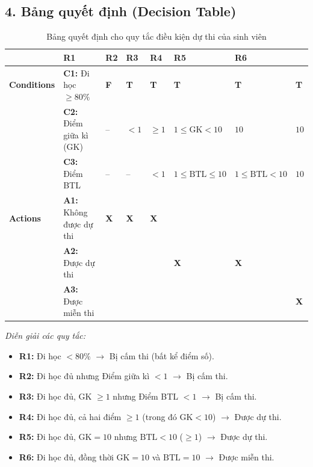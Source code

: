 \documentclass[11pt,a4paper]{article}
\begin{document}
\subsection*{4. Bảng quyết định (Decision Table)}

\begin{table}[H]
\centering
\renewcommand{\arraystretch}{1.25}
\begin{tabularx}{\textwidth}{|l|l|Y|Y|Y|Y|Y|Y|}
\hline
{}
 & \textbf{R1} & \textbf{R2} & \textbf{R3} & \textbf{R4} & \textbf{R5} & \textbf{R6} \\ \hline
\textbf{Conditions} & \textbf{C1:} Đi học $\ge 80\%$ & \textbf{F} & \textbf{T} & \textbf{T} & \textbf{T} & \textbf{T} & \textbf{T} \\ 
 & \textbf{C2:} Điểm giữa kì (GK) & -- & $< 1$ & $\ge 1$ & $1 \le \text{GK} < 10$ & $10$ & $10$ \\ 
 & \textbf{C3:} Điểm BTL & -- & -- & $< 1$ & $1 \le \text{BTL} \le 10$ & $1 \le \text{BTL} < 10$ & $10$ \\ \hline
\textbf{Actions} & \textbf{A1:} Không được dự thi & \textbf{X} & \textbf{X} & \textbf{X} & & & \\ 
 & \textbf{A2:} Được dự thi & & & & \textbf{X} & \textbf{X} & \\ 
 & \textbf{A3:} Được miễn thi & & & & & & \textbf{X} \\ \hline
\end{tabularx}
\caption*{Bảng quyết định cho quy tắc điều kiện dự thi của sinh viên}
\end{table}

\noindent\textit{Diễn giải các quy tắc:}
\begin{itemize}[noitemsep]
    \item \textbf{R1:} Đi học $< 80\%$ $\rightarrow$ Bị cấm thi (bất kể điểm số).
    \item \textbf{R2:} Đi học đủ nhưng Điểm giữa kì $< 1$ $\rightarrow$ Bị cấm thi.
    \item \textbf{R3:} Đi học đủ, GK $\ge 1$ nhưng Điểm BTL $< 1$ $\rightarrow$ Bị cấm thi.
    \item \textbf{R4:} Đi học đủ, cả hai điểm $\ge 1$ (trong đó $\text{GK} < 10$) $\rightarrow$ Được dự thi.
    \item \textbf{R5:} Đi học đủ, $\text{GK} = 10$ nhưng $\text{BTL} < 10$ ($\ge 1$) $\rightarrow$ Được dự thi.
    \item \textbf{R6:} Đi học đủ, đồng thời $\text{GK} = 10$ và $\text{BTL} = 10$ $\rightarrow$ Được miễn thi.
\end{itemize}
\end{document}
